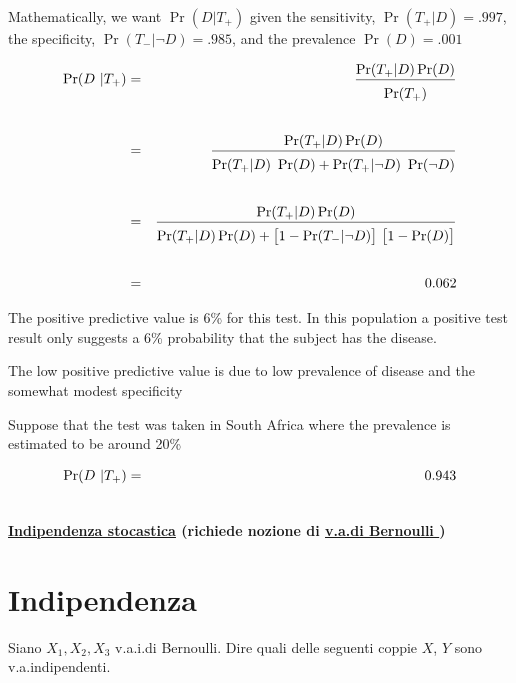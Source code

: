 \documentclass[11pt,openany]{book}
\begin{document}
Mathematically, we want $\Pr(D | T_+)$ given the sensitivity, {\color{violet}$\Pr(T_+
| D) = .997$}, the specificity, {\color{violet}$\Pr(T_- | \neg D) =.985$}, and the
prevalence {\color{violet}$\Pr(D) = .001$}

\begin{eqnarray*}
\Pr(D ~|T_+)& = &\frac{\Pr(T_+|D)\Pr(D)}{\Pr(T_+)\vphantom{\Big[}}\\ \\
& = &\frac{\Pr(T_+|D)\Pr(D)}{\Pr(T_+|D)\ \Pr(D) + \Pr(T_+|\neg D)\ \Pr(\neg D)\vphantom{\Big[}}\\ \\
& = & \frac{\Pr(T_+|D)\Pr(D)}{\Pr(T_+|D)\Pr(D) + \big[1-\Pr(T_-|\neg D)\big]\ \big[1 - \Pr(D)\big]\vphantom{\Big[}} \\ \\
& = & 0.062
\end{eqnarray*}

The {\color{violet}positive predictive value is 6\%} for this test. In this population a positive test result only suggests a 6\% probability that the subject has the disease. 


The low positive predictive value is due to low prevalence of disease and the
somewhat modest specificity 

Suppose that the test was taken in South Africa where the prevalence is estimated to be around 20\%

\begin{eqnarray*}
\Pr(D ~|T_+)& = & 0.943\\
& \hphantom{=} & \hphantom{\frac{\Pr(T_+|D)\Pr(D)}{\Pr(T_+|D)\Pr(D) + \big[1-\Pr(T_-|\neg D)\big]\ \big[1 - \Pr(D)\big]\vphantom{\Big[}}}
\end{eqnarray*}


\clearpage\hfill
\textbf{{\color{brown}\hyperref[indipendenza]{Indipendenza stocastica} \faShare} (richiede nozione di \hyperref[Bernoulli]{v.a.\@ di Bernoulli \faShare})}
\section{Indipendenza}
\label{esercizio_indipendenza}

Siano $X_1,X_2,X_3$ v.a.i.\@ di Bernoulli. Dire quali delle seguenti coppie $X$, $Y$ sono v.a.\@ indipendenti.\medskip
\end{document}
